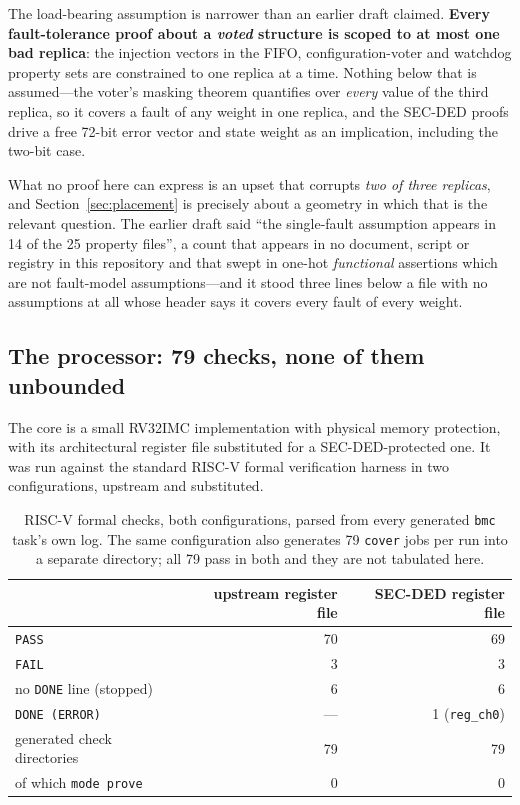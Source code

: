 \documentclass[11pt,a4paper]{article}
\begin{document}
The load-bearing assumption is narrower than an earlier draft claimed.
\textbf{Every fault-tolerance proof about a \emph{voted} structure is
scoped to at most one bad replica}: the injection vectors in the FIFO,
configuration-voter and watchdog property sets are constrained to one
replica at a time. Nothing below that is assumed---the voter's masking
theorem quantifies over \emph{every} value of the third replica, so it
covers a fault of any weight in one replica, and the SEC-DED proofs
drive a free 72-bit error vector and state weight as an implication,
including the two-bit case.

What no proof here can express is an upset that corrupts \emph{two of
three replicas}, and Section~\ref{sec:placement} is precisely about a
geometry in which that is the relevant question. The earlier draft said
``the single-fault assumption appears in 14 of the 25 property files'',
a count that appears in no document, script or registry in this
repository and that swept in one-hot \emph{functional} assertions which
are not fault-model assumptions---and it stood three lines below a file
with no assumptions at all whose header says it covers every fault of
every weight.

\subsection{The processor: 79 checks, none of them unbounded}
\label{sec:rvformal}

The core is a small RV32IMC implementation with physical memory
protection, with its architectural register file substituted for a
SEC-DED-protected one. It was run against the standard RISC-V formal
verification harness in two configurations, upstream and substituted.

\begin{table}[htbp]
\centering
\caption{RISC-V formal checks, both configurations, parsed from every
generated \texttt{bmc} task's own log. The same configuration also
generates 79 \texttt{cover} jobs per run into a separate directory; all
79 pass in both and they are not tabulated here.}
\label{tab:rvformal}
\small
\begin{tabular}{lrr}
\toprule
& upstream register file & SEC-DED register file \\
\midrule
\texttt{PASS} & 70 & 69 \\
\texttt{FAIL} & 3 & 3 \\
no \texttt{DONE} line (stopped) & 6 & 6 \\
\texttt{DONE (ERROR)} & --- & 1 (\texttt{reg\_ch0}) \\
\midrule
generated check directories & 79 & 79 \\
of which \texttt{mode prove} & 0 & 0 \\
\bottomrule
\end{tabular}
\end{table}
\end{document}
